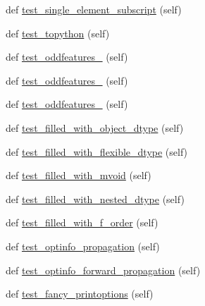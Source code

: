 \begin{DoxyCompactItemize}
\item 
def \hyperlink{classnumpy_1_1ma_1_1tests_1_1test__core_1_1TestMaskedArray_aa6965f1e6b47248e0bf24f4b2506e56e}{test\+\_\+single\+\_\+element\+\_\+subscript} (self)
\item 
def \hyperlink{classnumpy_1_1ma_1_1tests_1_1test__core_1_1TestMaskedArray_af63d2e49d3e9a4b692f3f658c6e56a1f}{test\+\_\+topython} (self)
\item 
def \hyperlink{classnumpy_1_1ma_1_1tests_1_1test__core_1_1TestMaskedArray_ab470cd0af7de85014959f54176b8c8df}{test\+\_\+oddfeatures\+\_} (self)
\item 
def \hyperlink{classnumpy_1_1ma_1_1tests_1_1test__core_1_1TestMaskedArray_a45d520ac834523d802d43293a3e1f974}{test\+\_\+oddfeatures\+\_} (self)
\item 
def \hyperlink{classnumpy_1_1ma_1_1tests_1_1test__core_1_1TestMaskedArray_a5fd3a5df37a8b29240633c1503368b4c}{test\+\_\+oddfeatures\+\_} (self)
\item 
def \hyperlink{classnumpy_1_1ma_1_1tests_1_1test__core_1_1TestMaskedArray_aeacb0bc07c61751db676ea382c2d5b0b}{test\+\_\+filled\+\_\+with\+\_\+object\+\_\+dtype} (self)
\item 
def \hyperlink{classnumpy_1_1ma_1_1tests_1_1test__core_1_1TestMaskedArray_ad48fc07c008bff544d9afb347b0d2b79}{test\+\_\+filled\+\_\+with\+\_\+flexible\+\_\+dtype} (self)
\item 
def \hyperlink{classnumpy_1_1ma_1_1tests_1_1test__core_1_1TestMaskedArray_aecdeecb06faeaa6241a9ed43bd114d8f}{test\+\_\+filled\+\_\+with\+\_\+mvoid} (self)
\item 
def \hyperlink{classnumpy_1_1ma_1_1tests_1_1test__core_1_1TestMaskedArray_a164a6ea559ef5d63c4eec66359797827}{test\+\_\+filled\+\_\+with\+\_\+nested\+\_\+dtype} (self)
\item 
def \hyperlink{classnumpy_1_1ma_1_1tests_1_1test__core_1_1TestMaskedArray_a84334b82e04a574f73e3e11a0ac35154}{test\+\_\+filled\+\_\+with\+\_\+f\+\_\+order} (self)
\item 
def \hyperlink{classnumpy_1_1ma_1_1tests_1_1test__core_1_1TestMaskedArray_a92439dc8eebf728566de23b58af2855c}{test\+\_\+optinfo\+\_\+propagation} (self)
\item 
def \hyperlink{classnumpy_1_1ma_1_1tests_1_1test__core_1_1TestMaskedArray_a4c75d927a6070185e61a28aaa564f406}{test\+\_\+optinfo\+\_\+forward\+\_\+propagation} (self)
\item 
def \hyperlink{classnumpy_1_1ma_1_1tests_1_1test__core_1_1TestMaskedArray_a1985d5000e4ae0e4069b7ebd62370a39}{test\+\_\+fancy\+\_\+printoptions} (self)

\end{DoxyCompactItemize}

